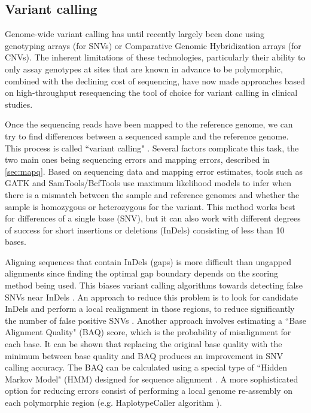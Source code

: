 \subsection{Variant calling \label{sec:varcall}}

Genome-wide variant calling has until recently largely been done using genotyping arrays (for SNVs) or Comparative Genomic Hybridization arrays (for CNVs). 
The inherent limitations of these technologies, particularly their ability to only assay genotypes at sites that are known in advance to be polymorphic, combined with the declining cost of sequencing, have now made approaches based on high-throughput resequencing the tool of choice for variant calling in clinical studies. 

Once the sequencing reads have been mapped to the reference genome, we can try to find differences between a sequenced sample and the reference genome. 
This process is called ``variant calling" \cite{nielsen2011genotype}.
Several factors complicate this task, the two main ones being sequencing errors and mapping errors, described in \ref{sec:mapq}. 
Based on sequencing data and mapping error estimates, tools such as GATK \cite{mckenna2010genome} and SamTools/BcfTools \cite{li2008mapping} use maximum likelihood models to infer when there is a mismatch between the sample and reference genomes and whether the sample is homozygous or heterozygous for the variant. 
This method works best for differences of a single base (SNV), but it can also work with different degrees of success for short insertions or deletions (InDels) consisting of less than 10 bases. 

Aligning sequences that contain InDels (gaps) is more difficult than ungapped alignments since finding the optimal gap boundary depends on the scoring method being used. 
This biases variant calling algorithms towards detecting false SNVs near InDels \cite{depristo2011framework}.  
An approach to reduce this problem is to look for candidate InDels and perform a local realignment in those regions, to reduce significantly the number of false positive SNVs \cite{depristo2011framework}. 
Another approach involves estimating a ``Base Alignment Quality" (BAQ) \cite{li2011improving} score, which is the probability of misalignment for each base.  
It can be shown that replacing the original base quality with the minimum between base quality and BAQ produces an improvement in SNV calling accuracy.  
The BAQ can be calculated using a special type of ``Hidden Markov Model" (HMM) designed for sequence alignment \cite{li2011improving, durbin1998biological}. 
A more sophisticated option for reducing errors consist of performing a local genome re-assembly on each polymorphic region (e.g. HaplotypeCaller algorithm \cite{GATK}).

